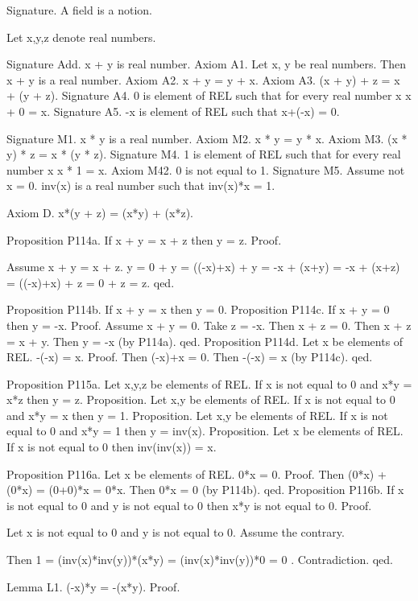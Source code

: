 \documentclass{article}
\newenvironment{forthel}{\begin{leftbar}}{\end{leftbar}}
\begin{document}
\begin{forthel}

Signature. A field is a notion.

Let x,y,z denote real numbers.

Signature Add. x + y is real number.
Axiom A1. Let x, y be real numbers. Then x + y is a real number.
Axiom A2. x + y = y + x.
Axiom A3. (x + y) + z = x + (y + z). 
Signature A4. 0 is element of REL such that for every real number x x + 0 = x.
Signature A5. -x is element of REL such that x+(-x) = 0.

Signature M1. x * y is a real number.
Axiom M2. x * y = y * x.
Axiom M3. (x * y) * z = x * (y * z).
Signature M4. 1 is element of REL such that for every real number x x * 1 = x.
Axiom M42. 0 is not equal to 1.
Signature M5. Assume not x = 0. inv(x) is a real number such that inv(x)*x = 1.

Axiom D. x*(y + z) = (x*y) + (x*z).



Proposition P114a.
If x + y = x + z then y = z.
Proof.

Assume x + y = x + z.
y  = 0 + y
= ((-x)+x) + y
= -x + (x+y)
= -x + (x+z)
= ((-x)+x) + z
= 0 + z
= z.
qed.

Proposition P114b.
If x + y = x then y = 0.
Proposition P114c. 
If x + y = 0 then y = -x.
Proof.
Assume x + y = 0.
Take z = -x. Then x + z = 0.
Then x + z = x + y. Then y = -x (by P114a).
qed.
Proposition P114d. 
Let x be elements of REL. -(-x) = x.
Proof.
Then (-x)+x = 0.
Then -(-x) = x (by P114c).
qed.


Proposition P115a.
Let x,y,z be elements of REL. If x is not equal to 0 and x*y = x*z then y = z.
Proposition.
Let x,y be elements of REL. If x is not equal to 0 and x*y = x then y = 1.
Proposition.
Let x,y be elements of REL. If x is not equal to 0 and x*y = 1 then y = inv(x).
Proposition.
Let x be elements of REL. If x is not equal to 0 then inv(inv(x)) = x.



Proposition P116a.
Let x be elements of REL. 0*x = 0.
Proof.
Then (0*x) + (0*x)
= (0+0)*x
= 0*x.
Then 0*x = 0 (by P114b).
qed.
Proposition P116b. 
If x is not equal to 0 and y is not equal to 0 then x*y is not equal to 0.
Proof.

Let x is not equal to 0 and y is not equal to 0.
Assume the contrary.

Then 1 = (inv(x)*inv(y))*(x*y)
= (inv(x)*inv(y))*0
= 0 .
Contradiction.
qed.

Lemma L1.
(-x)*y = -(x*y).
Proof.


\end{forthel}
\end{document}
